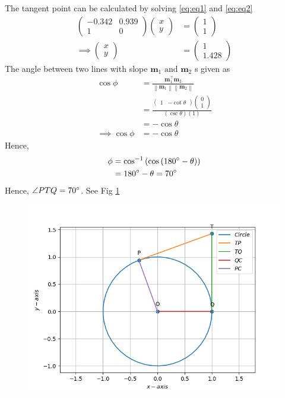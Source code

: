 \documentclass[12pt]{article}
\providecommand{\brak}[1]{\ensuremath{\left(#1\right)}}
\providecommand{\norm}[1]{\left\lVert#1\right\rVert}
\newcommand{\myvec}[1]{\ensuremath{\begin{pmatrix}#1\end{pmatrix}}}
\let\vec\mathbf
\begin{document}
The tangent point can be calculated by solving \eqref{eq:eq1} and \eqref{eq:eq2}
\begin{align}
	\myvec{-0.342&0.939\\1&0}\myvec{x\\y} &= \myvec{1\\1}\\
	\implies \myvec{x\\y} &= \myvec{1\\1.428}
\end{align}
The angle between two lines with slope $\vec{m}_1 \text{ and } \vec{m}_2$ s given as
\begin{align}
	\cos\phi &= \frac{\vec{m}_1^\top\vec{m}_2}{\norm{\vec{m}_1}\norm{\vec{m}_2}}\\
	&= \frac{\myvec{1&-\cot\theta}\myvec{0\\1}}{\brak{\csc\theta}\brak{1}}\\
	&= -\cos\theta\\
	\implies \cos\phi &= -\cos\theta
\end{align}
Hence,
\begin{align}
	\phi &= \cos^{-1}\brak{\cos{\brak{180\degree-\theta}}}\\
	     &= 180\degree-\theta = 70\degree
\end{align}
Hence, $\angle{PTQ} = 70\degree$. See Fig \ref{fig:Fig1}
\begin{figure}[!h]
	\begin{center} 
	    \includegraphics[width=\columnwidth]{figs/tangent2}
	\end{center}
\caption{}
\label{fig:Fig1}
\end{figure}
\end{document}
